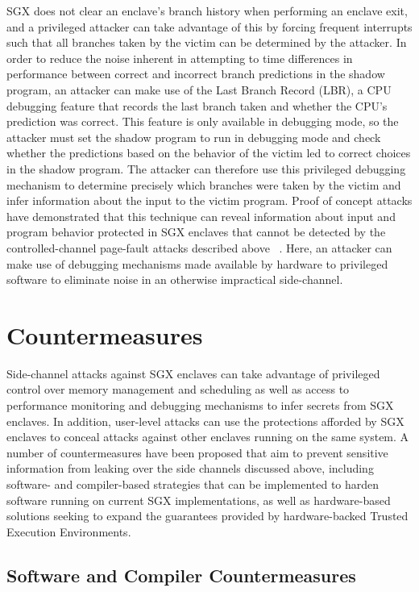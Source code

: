 SGX does not clear an enclave's branch history when performing an enclave exit, and a privileged attacker can take advantage of this by forcing frequent interrupts such that all branches taken by the victim can be determined by the attacker. In order to reduce the noise inherent in attempting to time differences in performance between correct and incorrect branch predictions in the shadow program, an attacker can make use of the Last Branch Record (LBR), a CPU debugging feature that records the last branch taken and whether the CPU's prediction was correct. This feature is only available in debugging mode, so the attacker must set the shadow program to run in debugging mode and check whether the predictions based on the behavior of the victim led to correct choices in the shadow program. The attacker can therefore use this privileged debugging mechanism to determine precisely which branches were taken by the victim and infer information about the input to the victim program. Proof of concept attacks have demonstrated that this technique can reveal information about input and program behavior protected in SGX enclaves that cannot be detected by the controlled-channel page-fault attacks described above ~\cite{lee_inferring_2017, shinde_preventing_2015}. Here, an attacker can make use of debugging mechanisms made available by hardware to privileged software to eliminate noise in an otherwise impractical side-channel.

\section{Countermeasures}

Side-channel attacks against SGX enclaves can take advantage of privileged control over memory management and scheduling as well as access to performance monitoring and debugging mechanisms to infer secrets from SGX enclaves. In addition, user-level attacks can use the protections afforded by SGX enclaves to conceal attacks against other enclaves running on the same system. A number of countermeasures have been proposed that aim to prevent sensitive information from leaking over the side channels discussed above, including software- and compiler-based strategies that can be implemented to harden software running on current SGX implementations, as well as hardware-based solutions seeking to expand the guarantees provided by hardware-backed Trusted Execution Environments.

\subsection{Software and Compiler Countermeasures}

